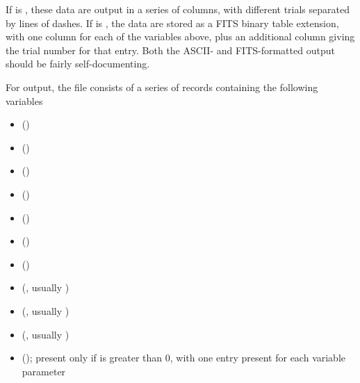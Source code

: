 \documentclass[letterpaper,10pt,english]{sphinxmanual}
\begin{document}
If  is , these data are output in a series of columns, with different trials separated by lines of dashes. If  is , the data are stored as a FITS binary table extension, with one column for each of the variables above, plus an additional column giving the trial number for that entry. Both the ASCII- and FITS-formatted output should be fairly self-documenting.

For  output, the file consists of a series of records containing the following variables
\begin{itemize}
\item {} 
 ()

\item {} 
 ()

\item {} 
 ()

\item {} 
 ()

\item {} 
 ()

\item {} 
 ()

\item {} 
 ()

\item {} 
 (, usually )

\item {} 
 (, usually )

\item {} 
 (, usually )

\item {} 
 (); present only if  is greater than 0, with one entry present for each variable parameter 

\end{itemize}
\end{document}
